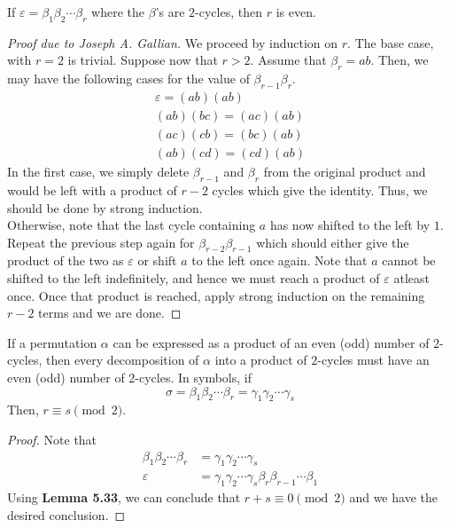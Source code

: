 \begin{lemma}
	If $\varepsilon=\beta_1\beta_2\cdots\beta_r$ where the $\beta$'s are $2$-cycles, then $r$ is even.
\end{lemma}
\begin{proof}[Proof due to Joseph A. Gallian]
	We proceed by induction on $r$. The base case, with $r=2$ is trivial. Suppose now that $r>2$. Assume that $\beta_r=ab$. Then, we may have the following cases for the value of $\beta_{r-1}\beta_r$.
	\begin{align*}
		\varepsilon = (ab)(ab)\\
		(ab)(bc) = (ac)(ab)\\
		(ac)(cb) = (bc)(ab)\\
		(ab)(cd) = (cd)(ab)
	\end{align*}
	In the first case, we simply delete $\beta_{r-1}$ and $\beta_{r}$ from the original product and would be left with a product of $r-2$ cycles which give the identity. Thus, we should be done by strong induction.\\
	Otherwise, note that the last cycle containing $a$ has now shifted to the left by $1$. Repeat the previous step again for $\beta_{r-2}\beta_{r-1}$ which should either give the product of the two as $\varepsilon$ or shift $a$ to the left once again. Note that $a$ cannot be shifted to the left indefinitely, and hence we must reach a product of $\varepsilon$ atleast once. Once that product is reached, apply strong induction on the remaining $r-2$ terms and we are done.
\end{proof}

\begin{proposition}
	If a permutation $\alpha$ can be expressed as a product of an even (odd) number of $2$-cycles, then every decomposition of $\alpha$ into a product of $2$-cycles must have an even (odd) number of $2$-cycles. In symbols, if 
	$$
	\sigma = \beta_1\beta_2\cdots\beta_r = \gamma_1\gamma_2\cdots\gamma_s
	$$
	Then, $r\equiv s\pmod2$.
 \end{proposition}
\begin{proof}
	Note that 
	\begin{align*}
		\beta_1\beta_2\cdots\beta_r &= \gamma_1\gamma_2\cdots\gamma_s\\
		\varepsilon &= \gamma_1\gamma_2\cdots\gamma_s\beta_r\beta_{r-1}\cdots\beta_1
	\end{align*}
	Using \textbf{Lemma 5.33}, we can conclude that $r+s\equiv0\pmod2$ and we have the desired conclusion.
\end{proof}

